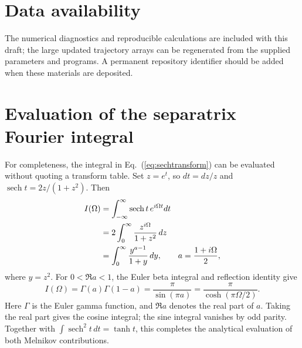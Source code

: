 \documentclass[aps,prb,reprint,floatfix]{revtex4-2}
\DeclareMathOperator{\sech}{sech}
\begin{document}
\section*{Data availability}
The numerical diagnostics and reproducible calculations are included with this draft; the large updated trajectory arrays can be regenerated from the supplied parameters and programs. A permanent repository identifier should be added when these materials are deposited.

\appendix
\section{Evaluation of the separatrix Fourier integral}
\label{app:transform}

For completeness, the integral in Eq.~(\ref{eq:sechtransform}) can be evaluated without quoting a transform table. Set $z=e^t$, so $dt=dz/z$ and $\sech t=2z/(1+z^2)$. Then
\begin{align}
 I(\Omega)&=\int_{-\infty}^{\infty}\sech t\,e^{i\Omega t}dt\notag\\
 &=2\int_0^\infty\frac{z^{i\Omega}}{1+z^2}\,dz\notag\\
 &=\int_0^\infty\frac{y^{a-1}}{1+y}\,dy,
 \qquad a=\frac{1+i\Omega}{2},
\end{align}
where $y=z^2$. For $0<\Re a<1$, the Euler beta integral and reflection identity give
\begin{equation}
 I(\Omega)=\Gamma(a)\Gamma(1-a)
 =\frac{\pi}{\sin(\pi a)}
 =\frac{\pi}{\cosh(\pi\Omega/2)}.
\end{equation}
Here $\Gamma$ is the Euler gamma function, and $\Re a$ denotes the real part of $a$. Taking the real part gives the cosine integral; the sine integral vanishes by odd parity. Together with $\int\sech^2t\,dt=\tanh t$, this completes the analytical evaluation of both Melnikov contributions.

\end{document}
